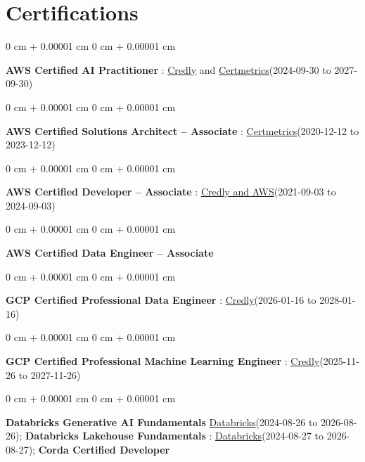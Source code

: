 \documentclass[10pt, letterpaper]{article}
\newenvironment{onecolentry}{
    \begin{adjustwidth}{
        0 cm + 0.00001 cm
    }{
        0 cm + 0.00001 cm
    }
}{
    \end{adjustwidth}
} %
\begin{document}
    \vspace{2 pt }
    \section{Certifications}
        \vspace{2 pt }
        \begin{samepage}
            \begin{onecolentry}
                \textbf{AWS Certified AI Practitioner} : \href{https://www.credly.com/badges/451b7ba5-8be1-4a8e-bbec-ade26627a6b6/public_url}{Credly} and \href{https://cp.certmetrics.com/amazon/en/public/verify/credential/495f0d9853874bf9a33c17f8e89ce131}{Certmetrics}(2024-09-30 to 2027-09-30)
            \end{onecolentry}
            \begin{onecolentry}
                \textbf{AWS Certified Solutions Architect – Associate} : \href{https://cp.certmetrics.com/amazon/en/public/verify/credential/SNBY48EBJJVE1SWX}{Certmetrics}(2020-12-12 to 2023-12-12)
            \end{onecolentry}
            \begin{onecolentry}
                \textbf{AWS Certified Developer – Associate} : \href{https://www.credly.com/badges/b8106fbd-d3d1-4204-8cdf-e708798fd582/public_url}{Credly and AWS}(2021-09-03  to 2024-09-03)
            \end{onecolentry}
            \begin{onecolentry}
                \textbf{AWS Certified Data Engineer – Associate}
            \end{onecolentry}
            \begin{onecolentry}
                \textbf{GCP Certified Professional Data Engineer} : \href{https://www.credly.com/badges/977e96d9-12e7-4f6c-b8a7-df71fb7153b8/public_url}{Credly}(2026-01-16 to 2028-01-16)
            \end{onecolentry}
            \begin{onecolentry}
                \textbf{GCP Certified Professional Machine Learning Engineer} : \href{https://www.credly.com/badges/a6965347-09ea-4d8f-b398-0e151407160d/public_url}{Credly}(2025-11-26 to 2027-11-26)
            \end{onecolentry}
            \begin{onecolentry}
                \textbf{Databricks Generative AI Fundamentals} \href{https://sgq.io/3uIFGNi}{Databricks}(2024-08-26 to 2026-08-26); \textbf{Databricks Lakehouse Fundamentals} : \href{https://scl.io/FXGKS0u}{Databricks}(2024-08-27 to 2026-08-27); \textbf{Corda Certified Developer}
            \end{onecolentry}
        \end{samepage}
\end{document}
